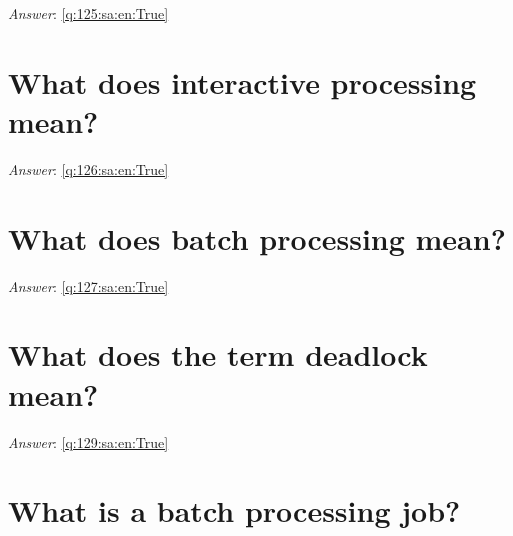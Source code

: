 \documentclass[a4paper,11pt,oneside]{book}
\begin{document}
\begin{sloppypar}
\textit{Answer}: \autoref{q:125:sa:en:True}



\section{What does interactive processing mean?}

\label{q:126:sa:en:False}

\vspace{2cm}

\noindent\makebox[\textwidth]{\hrulefill}

\vspace{1cm}

\textit{Answer}: \autoref{q:126:sa:en:True}



\section{What does batch processing mean?}

\label{q:127:sa:en:False}

\vspace{2cm}

\noindent\makebox[\textwidth]{\hrulefill}

\vspace{1cm}

\textit{Answer}: \autoref{q:127:sa:en:True}



\section{What does the term deadlock mean?}

\label{q:129:sa:en:False}

\vspace{2cm}

\noindent\makebox[\textwidth]{\hrulefill}

\vspace{1cm}

\textit{Answer}: \autoref{q:129:sa:en:True}



\section{What is a batch processing job?}

\label{q:130:sa:en:False}

\vspace{2cm}


\end{sloppypar}
\end{document}

